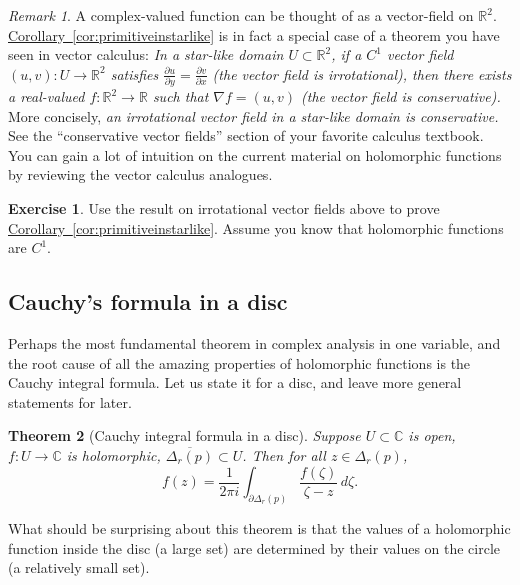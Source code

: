 \documentclass[12pt,openany]{book}
\newcommand{\C}{{\mathbb{C}}}
\newcommand{\R}{{\mathbb{R}}}
\theoremstyle{plain}
\newtheorem{thm}{Theorem}[section]
\theoremstyle{remark}
\newtheorem{remark}[thm]{Remark}
\theoremstyle{definition}
\newenvironment{exbox}{%
    \def\FrameCommand{\vrule width 1pt \relax\hspace {10pt}}%
    \MakeFramed {\advance \hsize -\width \FrameRestore }%
}{%
    \endMakeFramed
}
\theoremstyle{exercise}
\newtheorem{exercise}{Exercise}[section]
\theoremstyle{example}
\newcommand{\corref}[1]{\hyperref[#1]{Corollary~\ref*{#1}}}
\begin{document}
\begin{remark}
A complex-valued function can be thought of as a vector-field on $\R^2$.
\corref{cor:primitiveinstarlike}
is in fact a special case of a theorem you have seen
in vector calculus:  \emph{In a star-like domain $U \subset \R^2$, if a
$C^1$ vector field $(u,v) \colon U \to \R^2$
satisfies $\frac{\partial u}{\partial y} = \frac{\partial v}{\partial x}$
(the vector field is \emph{irrotational}),
then there exists a real-valued $f \colon \R^2 \to \R$ such that
$\nabla f = (u,v)$ (the vector field is conservative).}
More concisely, \emph{an irrotational vector field
in a star-like domain is conservative.}  See the ``conservative vector
fields'' section of your favorite calculus textbook.  You can gain a lot of
intuition on the current material on holomorphic functions by reviewing the
vector calculus analogues.
\end{remark}

\begin{exbox}
\begin{exercise}
Use the result on irrotational vector fields above to prove 
\corref{cor:primitiveinstarlike}.
Assume you know that holomorphic functions are $C^1$.
\end{exercise}
\end{exbox}

\subsection{Cauchy's formula in a disc}

Perhaps the most fundamental theorem in complex analysis in one variable,
and the root cause of all the amazing properties of holomorphic functions
is the Cauchy integral formula.  Let us state it for a disc, and leave
more general statements for later.

\begin{thm}[Cauchy integral formula in a disc]
Suppose $U \subset \C$ is open, $f \colon U \to \C$ is holomorphic,
$\overline{\Delta_r(p)} \subset U$.
Then for all $z \in \Delta_r(p)$,
\begin{equation*}
f(z)
=
\frac{1}{2\pi i}
\int_{\partial \Delta_r(p)}
\frac{f(\zeta)}{\zeta-z}
\,
d \zeta .
\end{equation*}
\end{thm}

What should be surprising about this theorem is that the values of a
holomorphic function inside the disc (a large set) are determined by their
values on the circle (a relatively small set).
\end{document}
